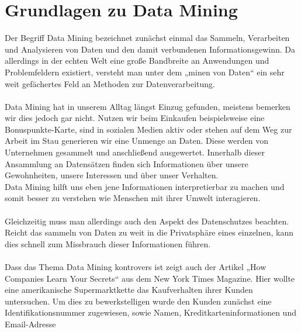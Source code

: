 %


%
%
\chapter{Grundlagen zu Data Mining}
\label{sec:intro}


Der Begriff Data Mining bezeichnet zunächst einmal das Sammeln, Verarbeiten und
Analysieren von Daten und den damit verbundenen Informationsgewinn. Da
allerdings in der echten Welt eine große Bandbreite an Anwendungen und
Problemfeldern existiert, versteht man unter dem „minen von Daten“ ein sehr
weit gefächertes Feld an Methoden zur Datenverarbeitung. \\
\\
Data Mining hat in unserem Alltag längst Einzug gefunden, meistens bemerken wir
dies jedoch gar nicht. Nutzen wir beim Einkaufen beispielsweise eine
Bonuspunkte-Karte, sind in sozialen Medien aktiv oder stehen auf dem Weg zur
Arbeit im Stau generieren wir eine Unmenge an Daten. Diese werden von
Unternehmen gesammelt und anschließend ausgewertet. Innerhalb dieser Ansammlung
an Datensätzen finden sich Informationen über unsere Gewohnheiten, unsere
Interessen und über unser Verhalten. \\
Data Mining hilft uns eben jene Informationen interpretierbar zu machen und
somit besser zu verstehen wie Menschen mit ihrer Umwelt interagieren. \\
\\
Gleichzeitig muss man allerdings auch den Aspekt des Datenschutzes beachten.
Reicht das sammeln von Daten zu weit in die Privatsphäre eines einzelnen,
kann dies schnell zum Missbrauch dieser Informationen führen. \\
\\
Dass das Thema Data Mining kontrovers ist zeigt auch der Artikel „How
Companies Learn Your Secrets“ aus dem New York Times Magazine. \cite{NYT:12} Hier wollte
eine amerikanische Supermarktkette das Kaufverhalten ihrer Kunden untersuchen.
Um dies zu bewerkstelligen wurde den Kunden zunächst eine Identifikationsnummer
zugewiesen, sowie Namen, Kreditkarteninformationen und Email-Adresse
